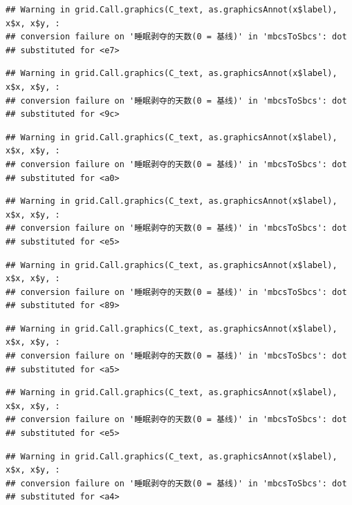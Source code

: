 \documentclass[
]{book}
\begin{document}
\begin{verbatim}
## Warning in grid.Call.graphics(C_text, as.graphicsAnnot(x$label), x$x, x$y, :
## conversion failure on '睡眠剥夺的天数(0 = 基线)' in 'mbcsToSbcs': dot
## substituted for <e7>
\end{verbatim}

\begin{verbatim}
## Warning in grid.Call.graphics(C_text, as.graphicsAnnot(x$label), x$x, x$y, :
## conversion failure on '睡眠剥夺的天数(0 = 基线)' in 'mbcsToSbcs': dot
## substituted for <9c>
\end{verbatim}

\begin{verbatim}
## Warning in grid.Call.graphics(C_text, as.graphicsAnnot(x$label), x$x, x$y, :
## conversion failure on '睡眠剥夺的天数(0 = 基线)' in 'mbcsToSbcs': dot
## substituted for <a0>
\end{verbatim}

\begin{verbatim}
## Warning in grid.Call.graphics(C_text, as.graphicsAnnot(x$label), x$x, x$y, :
## conversion failure on '睡眠剥夺的天数(0 = 基线)' in 'mbcsToSbcs': dot
## substituted for <e5>
\end{verbatim}

\begin{verbatim}
## Warning in grid.Call.graphics(C_text, as.graphicsAnnot(x$label), x$x, x$y, :
## conversion failure on '睡眠剥夺的天数(0 = 基线)' in 'mbcsToSbcs': dot
## substituted for <89>
\end{verbatim}

\begin{verbatim}
## Warning in grid.Call.graphics(C_text, as.graphicsAnnot(x$label), x$x, x$y, :
## conversion failure on '睡眠剥夺的天数(0 = 基线)' in 'mbcsToSbcs': dot
## substituted for <a5>
\end{verbatim}

\begin{verbatim}
## Warning in grid.Call.graphics(C_text, as.graphicsAnnot(x$label), x$x, x$y, :
## conversion failure on '睡眠剥夺的天数(0 = 基线)' in 'mbcsToSbcs': dot
## substituted for <e5>
\end{verbatim}

\begin{verbatim}
## Warning in grid.Call.graphics(C_text, as.graphicsAnnot(x$label), x$x, x$y, :
## conversion failure on '睡眠剥夺的天数(0 = 基线)' in 'mbcsToSbcs': dot
## substituted for <a4>
\end{verbatim}
\end{document}

